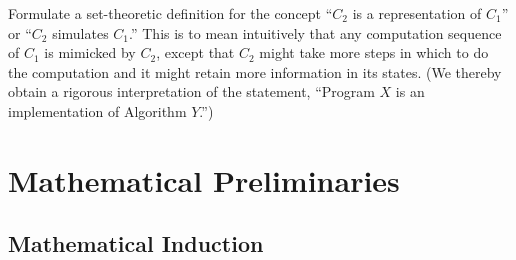 Formulate a set-theoretic definition for the concept ``$C_2$ is a representation of $C_1$'' or ``$C_2$ simulates $C_1$.'' This is to mean intuitively that any computation sequence of $C_1$ is mimicked by $C_2$, except that $C_2$ might take more steps in which to do the computation and it might retain more information in its states. (We thereby obtain a rigorous interpretation of the statement, ``Program $X$ is an implementation of Algorithm $Y$.'')

\section{Mathematical Preliminaries}
\subsection{Mathematical Induction}